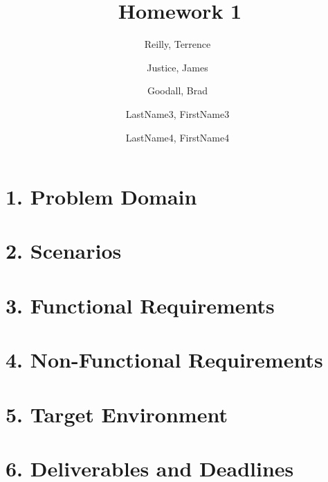 \documentclass[a4paper,12pt]{article}
\author{
    Reilly, Terrence\
    \and
    Justice, James\
    \and
    Goodall, Brad\
    \and
    LastName3, FirstName3\
    \and
    LastName4, FirstName4\
}
\title{Homework 1}
\begin{document}
    \maketitle

    \section*{1. Problem Domain}
        

    \section*{2. Scenarios}
        

    \section*{3. Functional Requirements}
        

    \section*{4. Non-Functional Requirements}
        

    \section*{5. Target Environment}
        

    \section*{6. Deliverables and Deadlines}
        
\end{document}
